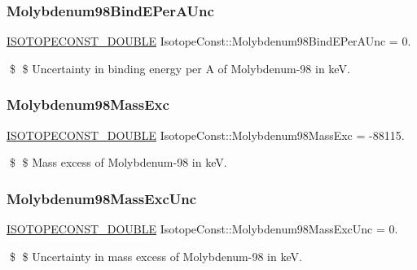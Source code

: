 \subsubsection{\texorpdfstring{Molybdenum98\+Bind\+E\+Per\+A\+Unc}{Molybdenum98BindEPerAUnc}}
{\footnotesize\ttfamily \mbox{\hyperlink{group___isotope_const-_macros_ga8f45a7272ce02c0b4c65c44636ed719a}{I\+S\+O\+T\+O\+P\+E\+C\+O\+N\+S\+T\+\_\+\+D\+O\+U\+B\+LE}} Isotope\+Const\+::\+Molybdenum98\+Bind\+E\+Per\+A\+Unc = 0.}

\$ \$ Uncertainty in binding energy per A of Molybdenum-\/98 in keV. \mbox{\label{group___isotope_const-_molybdenum-_mo98_gafe9fba3c40a0e36539adb8423de960fb}} 
\subsubsection{\texorpdfstring{Molybdenum98\+Mass\+Exc}{Molybdenum98MassExc}}
{\footnotesize\ttfamily \mbox{\hyperlink{group___isotope_const-_macros_ga8f45a7272ce02c0b4c65c44636ed719a}{I\+S\+O\+T\+O\+P\+E\+C\+O\+N\+S\+T\+\_\+\+D\+O\+U\+B\+LE}} Isotope\+Const\+::\+Molybdenum98\+Mass\+Exc = -\/88115.}

\$ \$ Mass excess of Molybdenum-\/98 in keV. \mbox{\label{group___isotope_const-_molybdenum-_mo98_gaacaa62d6eec2f1dcc1e7df5aa36f723a}} 
\subsubsection{\texorpdfstring{Molybdenum98\+Mass\+Exc\+Unc}{Molybdenum98MassExcUnc}}
{\footnotesize\ttfamily \mbox{\hyperlink{group___isotope_const-_macros_ga8f45a7272ce02c0b4c65c44636ed719a}{I\+S\+O\+T\+O\+P\+E\+C\+O\+N\+S\+T\+\_\+\+D\+O\+U\+B\+LE}} Isotope\+Const\+::\+Molybdenum98\+Mass\+Exc\+Unc = 0.}

\$ \$ Uncertainty in mass excess of Molybdenum-\/98 in keV. \mbox{\label{group___isotope_const-_molybdenum-_mo98_ga6ee229ef1f7830016b0fcb81cb4e545c}} 
